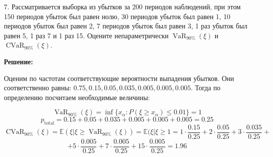 \documentclass[%
12pt, %
final, %
oneside, %
onecolumn, %
centertags]{article} %
\theoremstyle{plain}
\theoremstyle{definition}
\theoremstyle{remark}
\begin{document}
\newpage

7. Рассматривается выборка из убытков за 200 периодов наблюдений, при этом 150
периодов убыток был равен нолю, 30 периодов убыток был равен 1, 10 периодов
убыток был равен 2, 7 периодов убыток был равен 3, 1 раз убыток был равен 5, 1
раз 7 и 1 раз 15. Оцените непараметрически $\operatorname{VaR}_{90\%}(\xi)$ и $\operatorname{CVaR}_{90\%}(\xi)$.

\textbf{Решение:}

Оценим по частотам соответствующие вероятности выпадения убытков. Они соответственно равны: $0.75, 0.15, 0.05, 0.035, 0.005, 0.005, 0.005$. Тогда по определению посчитаем необходимые величины:

$$\operatorname{VaR}_{90\%}(\xi) = \operatorname{inf}\{x_{\alpha}: P(\xi \geqslant x_{\alpha}) \leqslant 0.01\} = 1$$
$$p_{\operatorname{total}} = 0.15 + 0.05 + 0.035 + 0.005 + 0.005 + 0.005 = 0.25$$
$$\operatorname{CVaR}_{90\%}(\xi) = \mathbb{E}(\xi \vert \xi \geqslant \operatorname{VaR}_{90\%}(\xi)) =  \mathbb{E}(\xi \vert \xi \geqslant 1 = 1 \cdot \frac{ 0.15}{0.25} + 2 \cdot \frac{ 0.05}{0.25} + 3 \cdot \frac{ 0.035}{0.25} +$$
$$ + 5 \cdot \frac{ 0.005}{0.25} + 7 \cdot \frac{ 0.005}{0.25} + 15 \cdot \frac{ 0.005}{0.25} = 1.96$$
\end{document}

